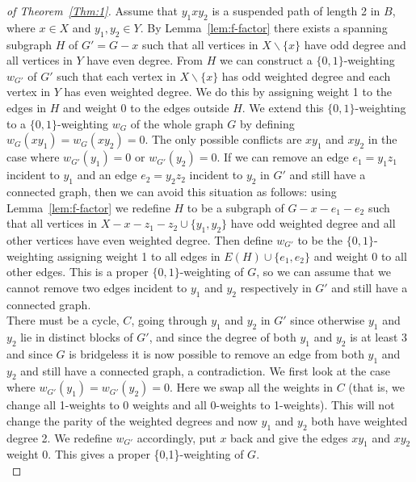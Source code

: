 \documentclass[
final,
 nomarks,
]{dmtcs-episciences}
\theoremstyle{definition}
\begin{document}
\begin{proof}[of Theorem~\ref{Thm:1}]
Assume that $y_1xy_2$ is a suspended path of length 2 in $B$, where $x \in X$ and $y_1,y_2 \in Y$. By Lemma~\ref{lem:f-factor} there exists a spanning subgraph $H$ of $G'=G-x$ such that all vertices in $X\backslash \{x\}$ have odd degree and all vertices in $Y$ have even degree. From $H$ we can construct a $\{0,1\}$-weighting $w_{G'}$ of $G'$ such that each vertex in $X\backslash \{x\}$ has odd weighted degree and each vertex in $Y$ has even weighted degree. We do this by assigning weight 1 to the edges in $H$ and weight 0 to the edges outside $H$. We extend this $\{0,1\}$-weighting to a $\{0,1\}$-weighting $w_{G}$ of the whole graph $G$ by defining $w_G(xy_1)=w_G(xy_2)=0$. The only possible conflicts are $xy_1$ and $xy_2$ in the case where $w_{G'}(y_1)=0$ or $w_{G'}(y_2)=0$. If we can remove an edge $e_1=y_1z_1$ incident to $y_1$ and an edge $e_2=y_2z_2$ incident to $y_2$ in $G'$ and still have a connected graph, then we can avoid this situation as follows: using Lemma~\ref{lem:f-factor} we redefine $H$ to be a subgraph of $G-x-e_1-e_2$ such that all vertices in $X-x-z_1-z_2 \cup \{y_1,y_2\}$ have odd weighted degree and all other vertices have even weighted degree. Then define $w_{G'}$ to be the $\{0,1\}$-weighting assigning weight 1 to all edges in $E(H) \cup \{e_1, e_2 \}$ and weight 0 to all other edges. This is a proper $\{0,1\}$-weighting of $G$, so we can assume that we cannot remove two edges incident to $y_1$ and $y_2$ respectively in $G'$ and still have a connected graph.  \\ 
There must be a cycle, $C$, going through $y_1$ and $y_2$ in $G'$ since otherwise $y_1$ and $y_2$ lie in distinct blocks of $G'$, and since the degree of both $y_1$ and $y_2$ is at least 3 and since $G$ is bridgeless it is now possible to remove an edge from both $y_1$ and $y_2$ and still have a connected graph, a contradiction.  We first look at the case where $w_{G'}(y_1)=w_{G'}(y_2)=0$. Here we swap all the weights in $C$ (that is, we change all 1-weights to 0 weights and all 0-weights to 1-weights). This will not change the parity of the weighted degrees and now $y_1$ and $y_2$ both have weighted degree 2. We redefine $w_{G'}$ accordingly, put $x$ back and give the edges $xy_1$ and $xy_2$ weight 0. This gives a proper \{0,1\}-weighting of $G$. \\

\end{proof}
\end{document}
